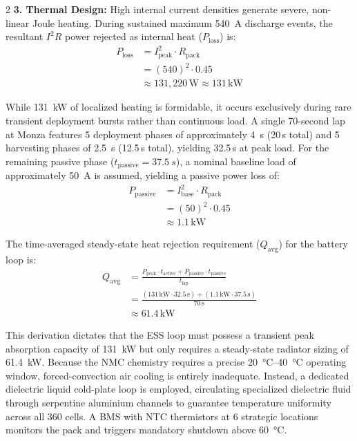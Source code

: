 \begin{multicols}{2}
\textbf{3. Thermal Design:}
High internal current densities generate severe, non-linear Joule heating. During sustained maximum \SI{540}{A} discharge events, the resultant $I^2R$ power rejected as internal heat ($P_{\text{loss}}$) is:
\begin{equation} \label{eq:thermal_loss}
\begin{split}
P_{\text{loss}} &= I_{\text{peak}}^2 \cdot R_{\text{pack}} \\
&= (540)^2 \cdot 0.45 \\
&\approx 131{,}220\,\mathrm{W} \approx 131\,\mathrm{kW}
\end{split}
\end{equation}

While \SI{131}{\kilo\watt} of localized heating is formidable, it occurs exclusively during rare transient deployment bursts rather than continuous load. A single 70-second lap at Monza features 5 deployment phases of approximately \SI{4}{s} (20\,s total) and 5 harvesting phases of \SI{2.5}{s} (12.5\,s total), yielding 32.5\,s at peak load. For the remaining passive phase ($t_{\text{passive}} = \SI{37.5}{s}$), a nominal baseline load of approximately \SI{50}{A} is assumed, yielding a passive power loss of:
\begin{equation}
\begin{split}
P_{\text{passive}} &= I_{\text{base}}^2 \cdot R_{\text{pack}} \\
&= (50)^2 \cdot 0.45 \\
&\approx 1.1\,\mathrm{kW}
\end{split}
\end{equation}

The time-averaged steady-state heat rejection requirement ($Q_{\text{avg}}$) for the battery loop is:
\begin{equation}
\begin{split}
Q_{\text{avg}} &= \frac{P_{\text{peak}} \cdot t_{\text{active}} + P_{\text{passive}} \cdot t_{\text{passive}}}{t_{\text{lap}}} \\
&= \frac{(131\,\mathrm{kW} \cdot 32.5\,\mathrm{s}) + (1.1\,\mathrm{kW} \cdot 37.5\,\mathrm{s})}{70\,\mathrm{s}} \\
&\approx 61.4\,\mathrm{kW}
\end{split}
\end{equation}

This derivation dictates that the ESS loop must possess a transient peak absorption capacity of \SI{131}{\kilo\watt} but only requires a steady-state radiator sizing of \SI{61.4}{\kilo\watt}. Because the NMC chemistry requires a precise \SIrange{20}{40}{\celsius} operating window, forced-convection air cooling is entirely inadequate. Instead, a dedicated dielectric liquid cold-plate loop is employed, circulating specialized dielectric fluid through serpentine aluminium channels to guarantee temperature uniformity across all 360 cells. A BMS with NTC thermistors at 6 strategic locations monitors the pack and triggers mandatory shutdown above \SI{60}{\celsius}.
\end{multicols}

